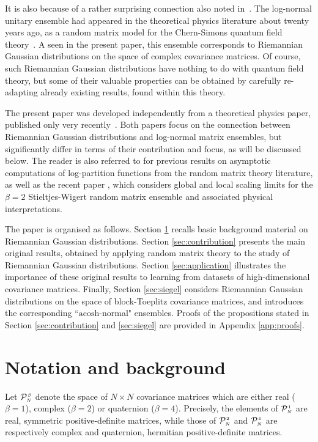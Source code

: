 \documentclass[draftclsnofoot]{IEEEtran}
\begin{document}
It is also because of a rather surprising connection also noted in~\cite{SH21}. The log-normal unitary ensemble had appeared in the theoretical physics literature about twenty years ago, as a random matrix model for the Chern-Simons quantum field theory~\cite{Ma05}. A seen in the present paper, this ensemble corresponds to Riemannian Gaussian distributions on the space of complex covariance matrices. Of course, such Riemannian Gaussian distributions have nothing to do with quantum field theory, but some of their valuable properties can be obtained by carefully re-adapting already existing results, found within this theory. %


The present paper was developed independently from a theoretical physics paper, published only very recently~\cite{Ti20}. Both papers focus on the connection between Riemannian Gaussian distributions and log-normal matrix ensembles, but significantly differ in terms of their contribution and focus, as will be discussed below. The reader is also referred to \cite{Forrester1989} for previous results on asymptotic computations of log-partition functions from the random matrix theory literature, as well as the recent paper \cite{Forrester2021}, which considers global and local scaling limits for the $\beta=2$ Stieltjes-Wigert random matrix ensemble and associated physical interpretations. 

The paper is organised as follows. Section \ref{sec:background} recalls basic background material on Riemannian Gaussian distributions. Section \ref{sec:contribution} presents the main original results, obtained by applying random matrix theory to the study of Riemannian Gaussian distributions. Section \ref{sec:application} illustrates the importance of these original results to learning from datasets of high-dimensional covariance matrices. Finally, Section \ref{sec:siegel} considers Riemannian Gaussian distributions on the space of block-Toeplitz covariance matrices, and introduces the corresponding ``$\mathrm{acosh}$-normal" ensembles. Proofs of the propositions stated in Section \ref{sec:contribution} and \ref{sec:siegel} are provided in Appendix \ref{app:proofs}.

\section{Notation and background} \label{sec:background}
Let $\mathcal{P}^{\hspace{0.02cm}\scriptscriptstyle \beta}_{\scriptscriptstyle N}$ denote the space of $N \times N$ covariance matrices which are either real ($\beta = 1$), complex ($\beta = 2$) or quaternion ($\beta = 4$). Precisely, the elements of $\mathcal{P}^{\hspace{0.02cm}\scriptscriptstyle 1}_{\scriptscriptstyle N}$ are real, symmetric positive-definite matrices, while those of $\mathcal{P}^{\hspace{0.02cm}\scriptscriptstyle 2}_{\scriptscriptstyle N}$ and $\mathcal{P}^{\hspace{0.02cm}\scriptscriptstyle 4}_{\scriptscriptstyle N}$ are respectively complex and quaternion, hermitian positive-definite matrices.
\end{document}
